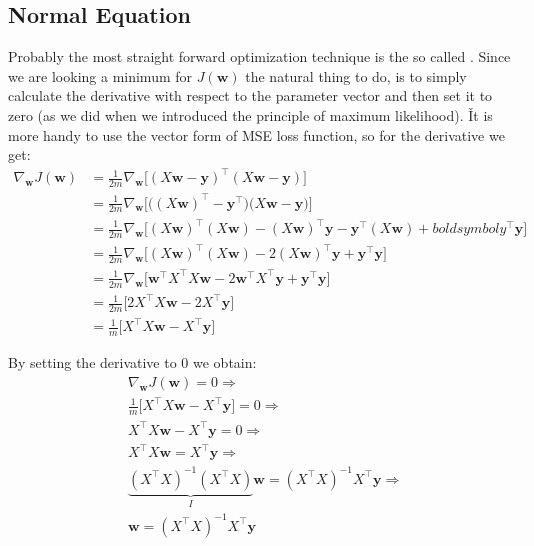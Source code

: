 \subsection{Normal Equation}

Probably the most straight forward optimization technique is the so called . Since we are
looking a minimum for $J(\boldsymbol{w})$ the natural thing to do, is to simply calculate the derivative with respect
to the parameter vector and then set it to zero (as we did when we introduced the principle of maximum likelihood). \v

It is more handy to use the vector form of MSE loss function, so for the derivative we get:
{\setlength{\jot}{10pt}
\begin{align*}
\nabla_{\boldsymbol{w}} J(\boldsymbol{w})
&= \frac{1}{2m} \nabla_{\boldsymbol{w}} \Big[ (X \boldsymbol{w} -
\boldsymbol{y})^{\intercal} (X \boldsymbol{w} - \boldsymbol{y}) \Big] \\
&= \frac{1}{2m} \nabla_{\boldsymbol{w}} \Big[ \Big( (X \boldsymbol{w})^{\intercal} -
\boldsymbol{y}^{\intercal} \Big) \Big( X \boldsymbol{w} - \boldsymbol{y} \Big) \Big] \\
&= \frac{1}{2m} \nabla_{\boldsymbol{w}} \Big[ (X \boldsymbol{w})^{\intercal} (X \boldsymbol{w}) -
(X\boldsymbol{w})^{\intercal} \boldsymbol{y} - \boldsymbol{y}^{\intercal}(X \boldsymbol{w}) +
boldsymbol{y}^{\intercal} \boldsymbol{y} \Big] \\
&= \frac{1}{2m} \nabla_{\boldsymbol{w}} \Big[ (X \boldsymbol{w})^{\intercal} (X \boldsymbol{w}) -
2 (X\boldsymbol{w})^{\intercal} \boldsymbol{y} + \boldsymbol{y}^{\intercal}\boldsymbol{y} \Big] \\
&= \frac{1}{2m} \nabla_{\boldsymbol{w}} \Big[ \boldsymbol{w}^{\intercal} X^{\intercal} X \boldsymbol{w} -
2\boldsymbol{w}^{\intercal} X^{\intercal} \boldsymbol{y} +\boldsymbol{y}^{\intercal} \boldsymbol{y} \Big] \\
&= \frac{1}{2m} \Big[ 2 X^{\intercal} X \boldsymbol{w} - 2 X^{\intercal}\boldsymbol{y} \Big] \\
&= \frac{1}{m} \Big[ X^{\intercal} X \boldsymbol{w} - X^{\intercal}\boldsymbol{y} \Big]
\end{align*}}

By setting the derivative to 0 we obtain:
{\setlength{\jot}{10pt}
\begin{align*}
& \nabla_{\boldsymbol{w}} J(\boldsymbol{w}) = 0 \Rightarrow \\
& \frac{1}{m} \Big[ X^{\intercal} X \boldsymbol{w} - X^{\intercal} \boldsymbol{y} \Big] = 0 \Rightarrow \\
& X^{\intercal} X \boldsymbol{w} - X^{\intercal} \boldsymbol{y} = 0 \Rightarrow \\
& X^{\intercal} X \boldsymbol{w} = X^{\intercal} \boldsymbol{y} \Rightarrow \\
& \underbrace{(X^{\intercal} X)^{-1} (X^{\intercal} X)}_{I} \boldsymbol{w} =
(X^{\intercal} X)^{-1} X^{\intercal} \boldsymbol{y} \Rightarrow \\
& \boldsymbol{w} = (X^{\intercal} X)^{-1} X^{\intercal} \boldsymbol{y}
\end{align*}}

